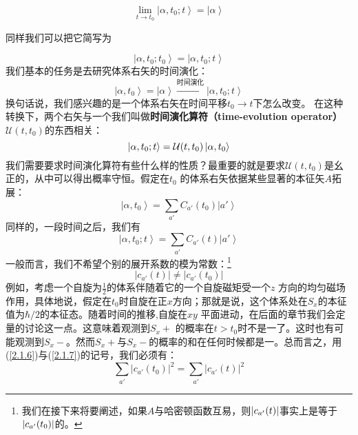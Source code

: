 \documentclass[UTF8,twoside]{ctexart}
\begin{document}
\begin{equation}
\lim_{t\rightarrow t_0}\left|\alpha, t_0; t\right\rangle=\left|\alpha\right\rangle
\end{equation}

\noindent 同样我们可以把它简写为

\begin{equation}
\left|\alpha, t_0; t_0\right\rangle = \left|\alpha, t_0; t\right\rangle
\end{equation}
\noindent 我们基本的任务是去研究体系右矢的时间演化：
\begin{equation}
\left|\alpha, t_0 \right\rangle =\left| \alpha\right\rangle\xrightarrow{\text{时间演化}}\left|\alpha, t_0; t\right\rangle
\end{equation}
\noindent 换句话说，我们感兴趣的是一个体系右矢在时间平移$t_0\rightarrow t $下怎么改变。
\noindent 在这种转换下，两个右矢与一个我们叫做{\textbf{时间演化算符（time-evolution operator）}}$\mathcal{U} (t,t_0)$的东西相关：
\begin{equation}\label{2.1.5}
\ket{\alpha, t_0; t}=\mathcal{U}(t,t_0)\ket{\alpha,t_0}
\end{equation}
\noindent 我们需要要求时间演化算符有些什么样的性质？最重要的就是要求$\mathcal{U}(t,t_0)$是幺正的，从中可以得出概率守恒。假定在$t_0$ 的体系右矢依据某些显著的本征矢$A$拓展：
\begin{equation}\label{2.1.6}
\left|\alpha, t_0\right\rangle=\sum_{a'} C_{a'}(t_0)\left|a'\right\rangle
\end{equation}
\noindent 同样的，一段时间之后，我们有
\begin{equation}\label{2.1.7}
\left|\alpha, t_0; t\right\rangle=\sum_{a'} C_{a'}(t)\left|a'\right\rangle
\end{equation}
\noindent 一般而言，我们不希望个别的展开系数的模为常数：\footnote{我们在接下来将要阐述，如果$A$与哈密顿函数互易，则$\abs{c_{a'}(t)}$事实上是等于$\abs{c_{a'}(t_0)}$的。}
\begin{equation} \label{2.1.8}
\left|c_{a'}(t)\right| \neq \left|c_{a'}(t_0)\right|
\end{equation}
\noindent 例如，考虑一个自旋为$\frac{1}{2}$的体系伴随着它的一个自旋磁矩受一个$z$ 方向的均匀磁场作用，具体地说，假定在$t_0$时自旋在正$x$方向；那就是说，这个体系处在$S_x$的本征值为$\hbar/2 $的本征态。随着时间的推移,自旋在$xy$ 平面进动，在后面的章节我们会定量的讨论这一点。这意味着观测到$S_x +$ 的概率在$t>t_0$时不是一了。这时也有可能观测到$S_x -$。然而$S_x +$与$S_x -$的概率的和在任何时候都是一。总而言之，用(\ref{2.1.6})与(\ref{2.1.7})的记号，我们必须有：
\begin{equation}
\sum_{a'}|c_{a'}(t_0)|^2 = \sum_{a'}|c_{a'}(t)|^2
\end{equation}
\end{document}
